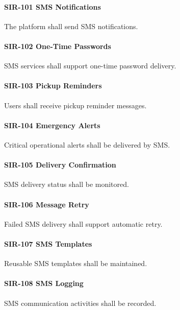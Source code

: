 \paragraph{SIR-101 SMS Notifications}

The platform shall send SMS notifications.

\paragraph{SIR-102 One-Time Passwords}

SMS services shall support one-time password delivery.

\paragraph{SIR-103 Pickup Reminders}

Users shall receive pickup reminder messages.

\paragraph{SIR-104 Emergency Alerts}

Critical operational alerts shall be delivered by SMS.

\paragraph{SIR-105 Delivery Confirmation}

SMS delivery status shall be monitored.

\paragraph{SIR-106 Message Retry}

Failed SMS delivery shall support automatic retry.

\paragraph{SIR-107 SMS Templates}

Reusable SMS templates shall be maintained.

\paragraph{SIR-108 SMS Logging}

SMS communication activities shall be recorded.

